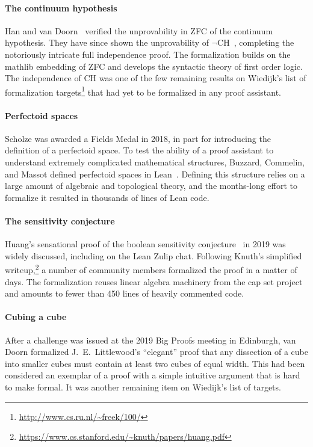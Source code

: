 \documentclass[sigplan]{acmart}\settopmatter{}
\newcommand{\mathlib}{\textsf{mathlib}\xspace}
\begin{document}
\paragraph{The continuum hypothesis} Han and van Doorn~\cite{Han19} verified the unprovability in ZFC of the continuum hypothesis.
They have since shown the unprovability of $\neg\text{CH}$~\cite{Han20}, completing the notoriously intricate full independence proof.
The formalization builds on the \mathlib embedding of ZFC and develops the syntactic theory of first order logic.
The independence of CH was one of the few remaining results
on Wiedijk's list of formalization targets\footnote{\url{http://www.cs.ru.nl/~freek/100/}}
that had yet to be formalized in any proof assistant.

\paragraph{Perfectoid spaces} Scholze was awarded a Fields Medal in 2018, in part for introducing the definition of a perfectoid space.
To test the ability of a proof assistant to understand extremely complicated mathematical structures, Buzzard, Commelin, and Massot defined perfectoid spaces in Lean~\cite{BCM20}.
Defining this structure relies on a large amount of algebraic and topological theory, and the months-long effort to formalize it resulted in thousands of lines of Lean code.

\paragraph{The sensitivity conjecture} Huang's sensational proof of the boolean sensitivity conjecture~\cite{Huan19} in 2019 was widely discussed, including on the Lean Zulip chat.
Following Knuth's simplified writeup,\footnote{\url{https://www.cs.stanford.edu/~knuth/papers/huang.pdf}} a number of community members formalized the proof in a matter of days.
The formalization reuses linear algebra machinery from the cap set project and amounts to fewer than 450 lines of heavily commented code.

\paragraph{Cubing a cube} After a challenge was issued at the 2019 Big Proofs meeting in Edinburgh, van Doorn formalized J.~E.\ Littlewood's ``elegant'' proof that any dissection of a cube into smaller cubes must contain at least two cubes of equal width.
This had been considered an exemplar of a proof with a simple intuitive argument that is hard to make formal.
It was another remaining item on Wiedijk's list of targets.
\end{document}
